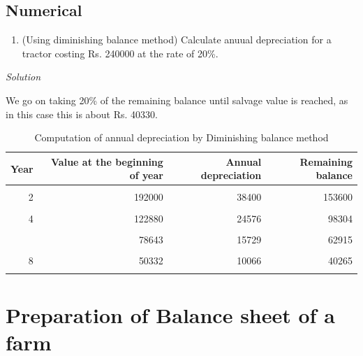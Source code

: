 \documentclass[
]{article}
\providecommand{\tightlist}{%
  \setlength{\itemsep}{0pt}\setlength{\parskip}{0pt}}
\begin{document}
\hypertarget{numerical}{%
\subsection*{Numerical}\label{numerical}}

\begin{enumerate}
\def\labelenumi{\arabic{enumi}.}
\tightlist
\item
  (Using diminishing balance method) Calculate anuual depreciation for a tractor costing Rs. 240000 at the rate of 20\%.
\end{enumerate}

\emph{Solution}

We go on taking 20\% of the remaining balance until salvage value is reached, as in this case this is about Rs. 40330.

\begin{table}[!h]

\caption{\label{tab:unnamed-chunk-2}Computation of annual depreciation by Diminishing balance method}
\centering
\fontsize{8}{10}\selectfont
\begin{tabular}[t]{rrrr}
\toprule
Year & Value at the beginning of year & Annual depreciation & Remaining balance\\
\midrule
\cellcolor{gray!6}{1} & \cellcolor{gray!6}{240000} & \cellcolor{gray!6}{48000} & \cellcolor{gray!6}{192000}\\
2 & 192000 & 38400 & 153600\\
\cellcolor{gray!6}{3} & \cellcolor{gray!6}{153600} & \cellcolor{gray!6}{30720} & \cellcolor{gray!6}{122880}\\
4 & 122880 & 24576 & 98304\\
\cellcolor{gray!6}{5} & \cellcolor{gray!6}{98304} & \cellcolor{gray!6}{19661} & \cellcolor{gray!6}{78643}\\
\addlinespace
6 & 78643 & 15729 & 62915\\
\cellcolor{gray!6}{7} & \cellcolor{gray!6}{62915} & \cellcolor{gray!6}{12583} & \cellcolor{gray!6}{50332}\\
8 & 50332 & 10066 & 40265\\
\cellcolor{gray!6}{9} & \cellcolor{gray!6}{40265} & \cellcolor{gray!6}{} & \cellcolor{gray!6}{}\\
\bottomrule
\end{tabular}
\end{table}

\clearpage

\hypertarget{preparation-of-balance-sheet-of-a-farm}{%
\section{Preparation of Balance sheet of a farm}\label{preparation-of-balance-sheet-of-a-farm}}
\end{document}
